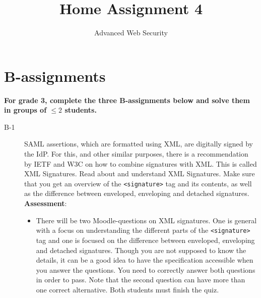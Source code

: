 \documentclass{article}
\begin{document}
	
	\title{Home Assignment 4}
	\author{Advanced Web Security}
	\date{\the\year}
	
	\maketitle
	
	\section*{B-assignments}
	\textbf{For grade 3, complete the three B-assignments below and solve them in groups of $\leq 2$ students.}
	
	\begin{description}
		
		\item[B-1]{SAML assertions, which are formatted using XML, are digitally signed by the IdP. For this, and other similar purposes, there is a recommendation by IETF and W3C on how to combine signatures with XML. This is called XML Signatures. Read about and understand XML Signatures. Make sure that you get an overview of the \texttt{<signature>} tag and its contents, as well as the difference between enveloped, enveloping and detached signatures.\\
			\textbf{Assessment}:
			\begin{itemize}
				\item There will be two Moodle-questions on XML signatures. One is general with a focus on understanding the different parts of the \texttt{<signature>} tag and one is focused on the difference between enveloped, enveloping and detached signatures. Though you are not supposed to know the details, it can be a good idea to have the specification accessible when you answer the questions. You need to correctly answer both questions in order to pass. Note that the second question can have more than one correct alternative. Both students must finish the quiz.
			\end{itemize}}
			

\end{description}
\end{document}

